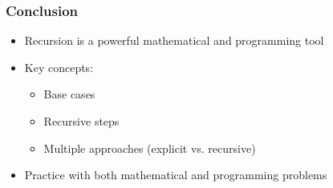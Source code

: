 \documentclass{beamer}
\begin{document}
\begin{frame}
\frametitle{Conclusion}
\begin{itemize}
    \item Recursion is a powerful mathematical and programming tool
    \item Key concepts:
    \begin{itemize}
        \item Base cases
        \item Recursive steps
        \item Multiple approaches (explicit vs. recursive)
    \end{itemize}
    \item Practice with both mathematical and programming problems
\end{itemize}
\end{frame}
\end{document}
